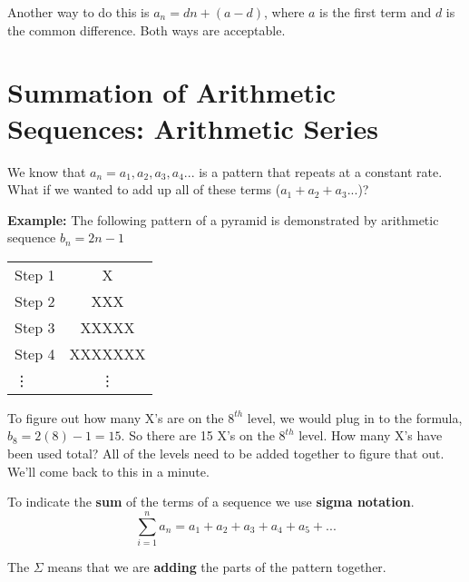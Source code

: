 \documentclass[12pt]{article}
\begin{document}
Another way to do this is $a_n=dn+(a-d)$, where $a$ is the first term and $d$ is the common difference. Both ways are acceptable.\\

\section{Summation of Arithmetic Sequences: Arithmetic Series}

We know that $a_n= a_1 , a_2 , a_3 , a_4 ...$ is a pattern that repeats at a constant rate. What if we wanted to add up all of these terms ($a_1+a_2+a_3...$)?\\

\begin{addmargin}[4em]{1em}

\textbf{Example:} The following pattern of a pyramid is demonstrated by arithmetic sequence $b_n=2n-1$\\

\begin{center}

\begin{tabular}{l c}

Step 1 & X\\
Step 2 & XXX\\
Step 3 & XXXXX\\
Step 4 & XXXXXXX\\
\vdots & \vdots

\end{tabular}

\end{center}

To figure out how many X's are on the $8^{th}$ level, we would plug in to the formula, $b_8=2(8)-1=15$. So there are 15 X's on the $8^{th}$ level. How many X's have been used total? All of the levels need to be added together to figure that out.\\

We'll come back to this in a minute.\\

\end{addmargin}

To indicate the \textbf{sum} of the terms of a sequence we use \textbf{sigma notation}.\\

$$\sum\limits_{i=1}^{n} a_n = a_1 + a_2 + a_3 + a_4 + a_5 + ...$$

The $\Sigma$ means that we are \textbf{adding} the parts of the pattern together. \\ 
\end{document}
